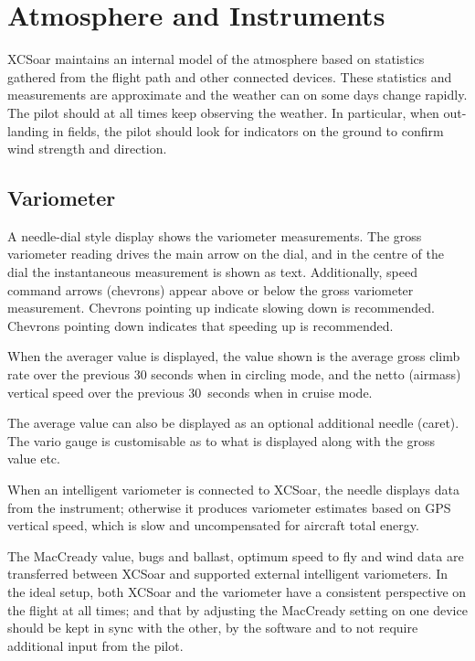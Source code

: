 
\chapter{Atmosphere and Instruments}\label{cha:atmosph}
XCSoar maintains an internal model of the atmosphere based on
statistics gathered from the flight path and other connected devices.
These statistics and measurements
are approximate and the weather can on some days change rapidly.  The
pilot should at all times keep observing the weather.  In
particular, when out-landing in fields, the pilot should look for
indicators on the ground to confirm wind strength and direction.

\section{Variometer}\label{sec:variometer}

A needle-dial style display shows the variometer measurements.  The
gross variometer reading drives the main arrow on the dial, and in the
centre of the dial the instantaneous measurement is shown as text.
Additionally, speed command arrows (chevrons) appear above or below
the gross variometer measurement.  Chevrons pointing up indicate
slowing down is recommended.  Chevrons pointing down indicates that
speeding up is recommended.  

When the averager value is displayed, the value shown is the average
gross climb rate over the previous 30 seconds when in circling mode,
and the netto (airmass) vertical speed over the previous 30~seconds
when in cruise mode.


The average value can also be displayed as an optional additional
needle (caret).
The vario gauge is customisable  as to what is displayed
along with the gross value etc.

When an intelligent variometer is connected to XCSoar, the needle
displays data from the instrument; otherwise it produces variometer
estimates based on GPS vertical speed, which is slow and uncompensated
for aircraft total energy.  

The MacCready value, bugs and ballast, optimum speed to fly and wind
data are transferred between XCSoar and supported external intelligent
variometers.  In the ideal setup, both XCSoar and the variometer have
a consistent perspective on the flight at all times; and that by
adjusting the MacCready setting on one device should be kept in sync
with the other, by the software and to not require additional input from
the pilot.

